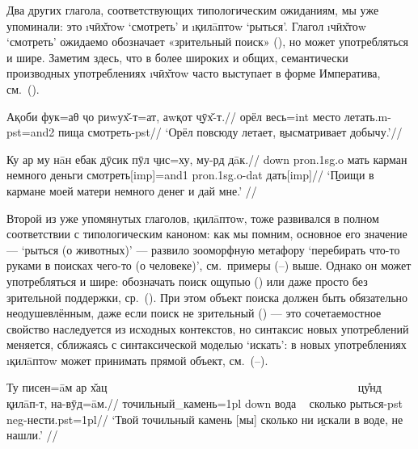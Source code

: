 Два других глагола, соответствующих типологическим ожиданиям, мы уже упоминали: это \i{чӣх̌тоw} ‘смотреть’ и \i{қилāптоw} ‘рыться’. Глагол \i{чӣх̌тоw} ‘смотреть’ ожидаемо обозначает «зрительный поиск» (), но может употребляться и шире. Заметим здесь, что в более широких и общих, семантически производных употреблениях \i{чӣх̌тоw} часто выступает в форме Императива, см.~().

\begingl
\gla Ақоби фук=аθ ҷо риwух̌-т=ат, аwқот \b{чӯх̌-т}.//
\glc орёл весь={\sc int} место летать.{\sc m-pst=and2} пища смотреть-{\sc pst}//
\glft ‘Орёл повсюду летает, \b{высматривает} добычу.’//
\endgl \xe

\begingl
\gla Ку ар му нāн ебак дӯсик пӯл \b{чис}=ху, му-рд дāк.//
 {\sc down} {\sc pron.1sg.o} мать карман немного деньги смотреть[{\sc imp}]={\sc and1} {\sc pron.1sg.o-dat} дать[{\sc imp}]//
\glft ‘\b{Поищи} в кармане моей матери немного денег и дай мне.’ //
\endgl \xe

Второй из уже упомянутых глаголов, \i{қилāптоw}, тоже развивался в полном соответствии с типологическим каноном: как мы помним, основное его значение — ‘рыться (о животных)’ — развило зооморфную метафору ‘перебирать что-то руками в поисках чего-то (о человеке)’, см.~примеры (–) выше. Однако он может употребляться и шире: обозначать поиск ощупью () или даже просто без зрительной поддержки, ср.~(). При этом объект поиска должен быть обязательно неодушевлённым, даже если поиск не зрительный () — это сочетаемостное свойство наследуется из исходных контекстов, но синтаксис новых употреблений меняется, сближаясь с синтаксической моделью ‘искать’: в новых употреблениях \i{қилāптоw} может принимать прямой объект, см.~(–).

\begingl
\gla Ту писен=āм ар х̌ац ~~~~~~~~~~~~~~~~~~~~~~~~~~~~~~~~~~~~~~~~~~~ цу̊нд \b{қилāп-т}, на-вӯд=āм.//
 точильный\_камень={\sc 1pl} {\sc down} вода ~ сколько рыться-{\sc pst} {\sc neg}-нести.{\sc pst=1pl}//
\glft ‘Твой точильный камень [мы] сколько ни \b{искали} в воде, не нашли.’ //
\endgl \xe

